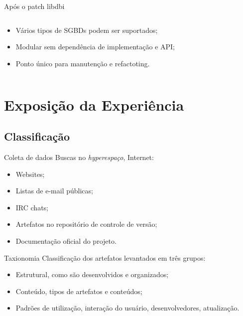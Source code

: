   \begin{frame}{Após o patch libdbi}
    \begin{columns}
      \begin{column}{5cm}
        \begin{itemize}
          \item <1> Vários tipos de SGBDs podem ser suportados;
          \item <2> Modular sem dependência de implementação e API;
          \item <3> Ponto único para manutenção e refactoting.
        \end{itemize}
      \end{column}
      \begin{column}{5cm}
      \end{column}
    \end{columns}
  \end{frame}

\section{Exposição da Experiência}

\subsection{Classificação}
\begin{frame}{Coleta de dados}
Buscas no \emph{hyperespaço}, Internet: 
  \begin{itemize}
    \item <1-> Websites;
    \item <2-> Listas de e-mail públicas;
    \item <3-> IRC chats;
    \item <4-> Artefatos no repositório de controle de versão;
    \item <5-> Documentação oficial do projeto.
  \end{itemize}
\end{frame}

\begin{frame}{Taxionomia}
Classificação dos artefatos levantados em três grupos:
  \begin{itemize}
  \item <1-> Estrutural, como são desenvolvidos e organizados;
  \item <2-> Conteúdo, tipos de artefatos e conteúdos;
  \item <3-> Padrões de utilização, interação do usuário, desenvolvedores, atualização.
  \end{itemize}
\end{frame}

